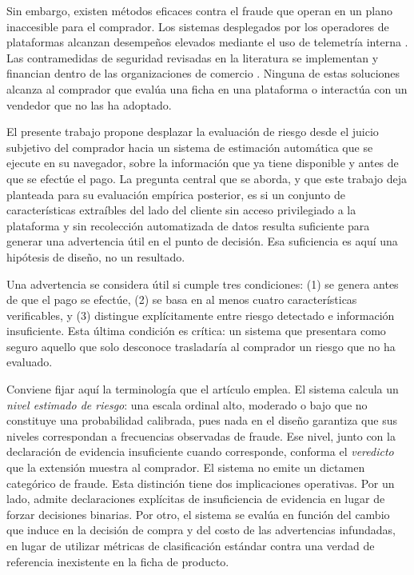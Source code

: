 Sin embargo, existen métodos eficaces contra el fraude que operan en un plano inaccesible
para el comprador. Los sistemas desplegados por los operadores de plataformas alcanzan
desempeños elevados mediante el uso de telemetría interna \cite{ref28}. Las contramedidas
de seguridad revisadas en la literatura se implementan y financian dentro de las organizaciones
de comercio \cite{ref30}. Ninguna de estas soluciones alcanza al comprador que evalúa una
ficha en una plataforma o interactúa con un vendedor que no las ha adoptado.

El presente trabajo propone desplazar la evaluación de riesgo desde el juicio subjetivo del
comprador hacia un sistema de estimación automática que se ejecute en su navegador, sobre la
información que ya tiene disponible y antes de que se efectúe el pago. La pregunta central que
se aborda, y que este trabajo deja planteada para su evaluación empírica posterior, es si un
conjunto de características extraíbles del lado del cliente sin acceso privilegiado a la
plataforma y sin recolección automatizada de datos resulta suficiente para generar una
advertencia útil en el punto de decisión. Esa suficiencia es aquí una hipótesis de diseño, no
un resultado.

Una advertencia se considera útil si cumple tres condiciones: (1) se genera antes de que el
pago se efectúe, (2) se basa en al menos cuatro características verificables, y (3)
distingue explícitamente entre riesgo detectado e información insuficiente. Esta última
condición es crítica: un sistema que presentara como seguro aquello que solo desconoce
trasladaría al comprador un riesgo que no ha evaluado.

Conviene fijar aquí la terminología que el artículo emplea. El sistema calcula un \emph{nivel
estimado de riesgo}: una escala ordinal alto, moderado o bajo que no constituye una
probabilidad calibrada, pues nada en el diseño garantiza que sus niveles correspondan a
frecuencias observadas de fraude. Ese nivel, junto con la declaración de evidencia
insuficiente cuando corresponde, conforma el \emph{veredicto} que la extensión muestra al
comprador. El sistema no emite un dictamen categórico de fraude. Esta distinción tiene dos
implicaciones operativas. Por un lado, admite declaraciones explícitas de insuficiencia de
evidencia en lugar de forzar decisiones binarias. Por otro, el sistema se evalúa en función
del cambio que induce en la decisión de compra y del costo de las advertencias infundadas, en
lugar de utilizar métricas de clasificación estándar contra una verdad de referencia
inexistente en la ficha de producto.

